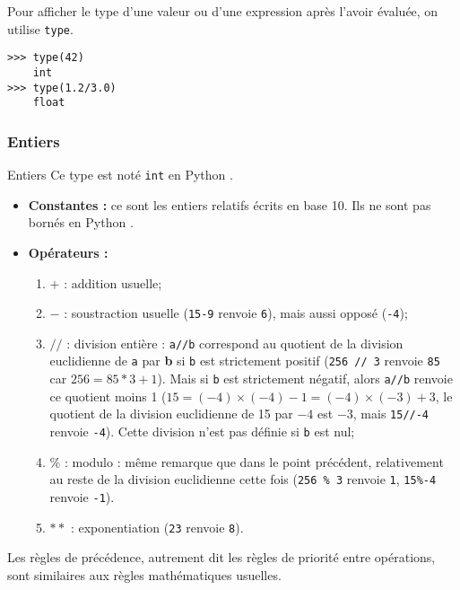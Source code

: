 Pour afficher le type d'une valeur ou d'une expression après l'avoir évaluée, on utilise 
\texttt{type}.
\begin{lstlisting}
>>> type(42)
	int
>>> type(1.2/3.0)
	float
\end{lstlisting}





\subsubsection{Entiers}
\begin{defi}{Entiers}
Ce type est noté \texttt{int} en Python .\\
\begin{itemize}
\item \textbf{Constantes :} ce sont les entiers relatifs écrits en base 10. Ils ne sont pas 
bornés en Python .
\item \textbf{Opérateurs :}
\begin{enumerate}
 \item $+$ : addition usuelle;
 \item $-$ : soustraction usuelle (\texttt{15-9} renvoie \texttt{6}), mais aussi opposé (\texttt{-4});
\item  $//$ : {division entière} : \texttt{a//b} correspond au quotient de la 
division euclidienne de \texttt{a} par \textbf{b} si \texttt{b} est strictement positif 
(\texttt{256 // 3} renvoie \texttt{85} car $256 = 85*3 + 1$). Mais si \texttt{b} est strictement 
négatif, alors \texttt{a//b} renvoie ce quotient moins 1 ($15 = (-4)\times(-4)-1=(-4)\times(-3)+3$, 
le quotient de la division euclidienne de 15 par $-4$ est $-3$, mais \texttt{15//-4} renvoie 
\texttt{-4}). Cette division n'est pas définie si \texttt{b} est nul;
\item $\%$ : {modulo} : même remarque que dans le point précédent, relativement au reste de la 
division euclidienne cette fois (\texttt{256 \% 3} renvoie 
\texttt{1}, \texttt{15\%-4} renvoie \texttt{-1}).
\item $**$ : exponentiation (\texttt{2\raisebox{0.3ex}{**}3} renvoie \texttt{8}).
\end{enumerate}
\end{itemize}
Les {règles de précédence}, autrement dit les règles de priorité entre opérations, sont 
similaires aux règles mathématiques usuelles.
\end{defi}
